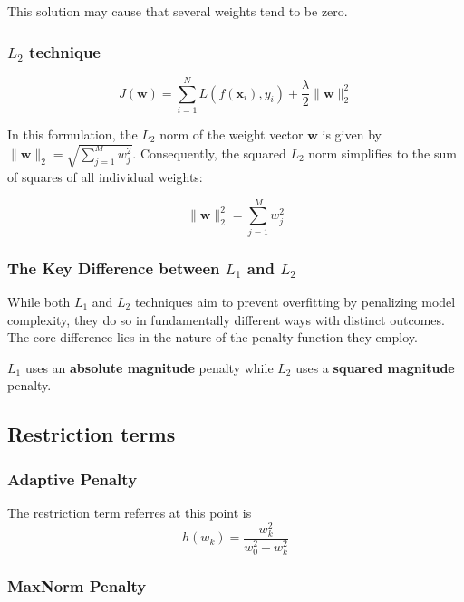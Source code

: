 \documentclass[
]{IEEEtran}
\begin{document}
This solution may cause that several weights tend to be zero.

\subsubsection{\texorpdfstring{\(L_2\)
technique}{L\_2 technique}}\label{l_2-technique}

\[
J(\mathbf{w}) = \sum_{i=1}^{N} L(f(\mathbf{x}_i), y_i) + \frac{\lambda}{2} \lVert \mathbf{w} \rVert_2^2
\]

In this formulation, the \(L_2\) norm of the weight vector
\(\mathbf{w}\) is given by
\(\lVert \mathbf{w} \rVert_2 = \sqrt{\sum_{j=1}^{M} w_j^2}\).
Consequently, the squared \(L_2\) norm simplifies to the sum of squares
of all individual weights:

\[
\lVert \mathbf{w} \rVert_2^2 = \sum_{j=1}^{M} w_j^2
\]

\subsubsection{\texorpdfstring{The Key Difference between \(L_1\) and
\(L_2\)}{The Key Difference between L\_1 and L\_2}}\label{the-key-difference-between-l_1-and-l_2}

While both \(L_1\) and \(L_2\) techniques aim to prevent overfitting by
penalizing model complexity, they do so in fundamentally different ways
with distinct outcomes. The core difference lies in the nature of the
penalty function they employ.

\(L_1\) uses an \textbf{absolute magnitude} penalty while \(L_2\) uses a
\textbf{squared magnitude} penalty.

\subsection{Restriction terms}\label{restriction-terms}

\subsubsection{Adaptive Penalty}\label{adaptive-penalty}

The restriction term referres at this point is
\[ h(w_k) = \frac{w_k^2}{w_0^2 + w_k^2} \]

\subsubsection{MaxNorm Penalty}\label{maxnorm-penalty}
\end{document}
